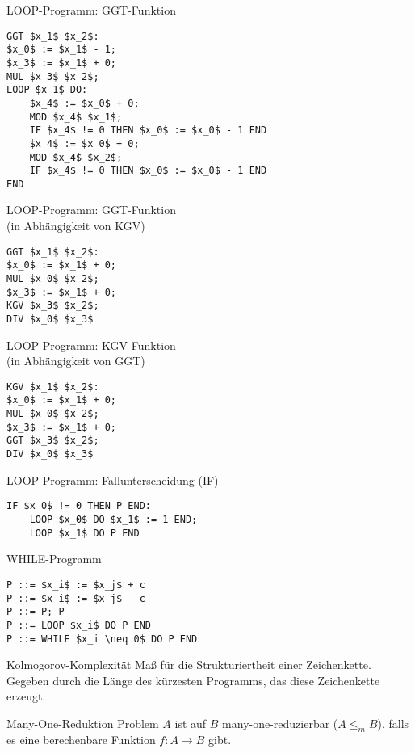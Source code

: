 \documentclass[a7paper,print,grid=both]{kartei}
\begin{document}
\begin{karte}{LOOP-Programm: GGT-Funktion}
\begin{lstlisting}[mathescape=true]
GGT $x_1$ $x_2$:
$x_0$ := $x_1$ - 1;
$x_3$ := $x_1$ + 0;
MUL $x_3$ $x_2$;
LOOP $x_1$ DO:
    $x_4$ := $x_0$ + 0;
    MOD $x_4$ $x_1$;
    IF $x_4$ != 0 THEN $x_0$ := $x_0$ - 1 END
    $x_4$ := $x_0$ + 0;
    MOD $x_4$ $x_2$;
    IF $x_4$ != 0 THEN $x_0$ := $x_0$ - 1 END
END
\end{lstlisting}
\end{karte}
\begin{karte}{LOOP-Programm: GGT-Funktion\\(in Abhängigkeit von KGV)}
\begin{lstlisting}[mathescape=true]
GGT $x_1$ $x_2$:
$x_0$ := $x_1$ + 0;
MUL $x_0$ $x_2$;
$x_3$ := $x_1$ + 0;
KGV $x_3$ $x_2$;
DIV $x_0$ $x_3$
\end{lstlisting}
\end{karte}
\begin{karte}{LOOP-Programm: KGV-Funktion\\(in Abhängigkeit von GGT)}
\begin{lstlisting}[mathescape=true]
KGV $x_1$ $x_2$:
$x_0$ := $x_1$ + 0;
MUL $x_0$ $x_2$;
$x_3$ := $x_1$ + 0;
GGT $x_3$ $x_2$;
DIV $x_0$ $x_3$
\end{lstlisting}
\end{karte}
\begin{karte}{LOOP-Programm: Fallunterscheidung (IF)}
\begin{lstlisting}[mathescape=true]
IF $x_0$ != 0 THEN P END:
    LOOP $x_0$ DO $x_1$ := 1 END;
    LOOP $x_1$ DO P END
\end{lstlisting}
\end{karte}
\begin{karte}{WHILE-Programm}
\begin{lstlisting}[mathescape=true]
P ::= $x_i$ := $x_j$ + c
P ::= $x_i$ := $x_j$ - c
P ::= P; P
P ::= LOOP $x_i$ DO P END
P ::= WHILE $x_i \neq 0$ DO P END
\end{lstlisting}
\end{karte}
\begin{karte}{Kolmogorov-Komplexität}
Maß für die Strukturiertheit einer Zeichenkette.\\
Gegeben durch die Länge des kürzesten Programms, das diese Zeichenkette erzeugt.
\end{karte}
\begin{karte}{Many-One-Reduktion}
Problem $A$ ist auf $B$ many-one-reduzierbar ($A \leq_m B$), falls es eine berechenbare Funktion $f:A\rightarrow B$ gibt.
\end{karte}
\end{document}
